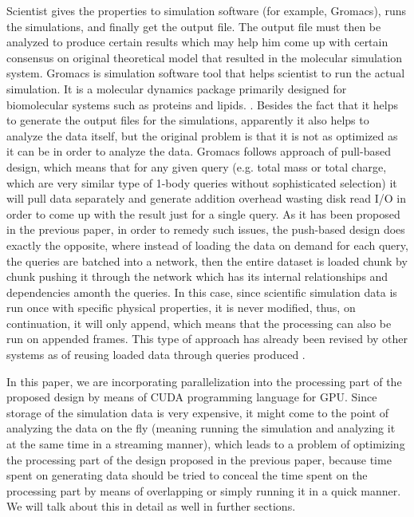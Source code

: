 \documentclass[12pt,letterpaper]{report}
\begin{document}
\noindent\hspace{3em}Scientist gives the properties to simulation software (for example, Gromacs), runs the simulations, and finally get the output file. The output file must then be analyzed to produce certain results which may help him come up with certain consensus on original theoretical model that resulted in the molecular simulation system\cite{Frenkel:api01}. Gromacs is simulation software tool that helps scientist to run the actual simulation. It is a molecular dynamics package primarily designed for biomolecular systems such as proteins and lipids. \cite{Gromacs-online}. Besides the fact that it helps to generate the output files for the simulations, apparently it also helps to analyze the data itself, but the original problem is that it is not as optimized as it can be in order to analyze the data. Gromacs follows approach of pull-based design, which means that for any given query (e.g. total mass or total charge, which are very similar type of 1-body queries without sophisticated selection) it will pull data separately and generate addition overhead wasting disk read I/O in order to come up with the result just for a single query. As it has been proposed in the previous paper, in order to remedy such issues, the push-based design does exactly the opposite, where instead of loading the data on demand for each query, the queries are batched into a network, then the entire dataset is loaded chunk by chunk pushing it through the network which has its internal relationships and dependencies amonth the queries. In this case, since scientific simulation data is run once with specific physical properties, it is never modified, thus, on continuation, it will only append, which means that the processing can also be run on appended frames. \cite{mainPaper}
This type of approach has already been revised by other systems \cite {DataPath,Volcano,Qpipe} as of reusing loaded data through queries produced \cite {Candea,PredictablePerformance,CooperativeScans}.

\noindent\hspace{3em}In this paper, we are incorporating parallelization into the processing part of the proposed design by means of CUDA programming language for GPU. Since storage of the simulation data is very expensive, it might come to the point of analyzing the data on the fly (meaning running the simulation and analyzing it at the same time in a streaming manner), which leads to a problem of optimizing the processing part of the design proposed in the previous paper, because time spent on generating data should be tried to conceal the time spent on the processing part by means of overlapping or simply running it in a quick manner. We will talk about this in detail as well in further sections.
\end{document}
